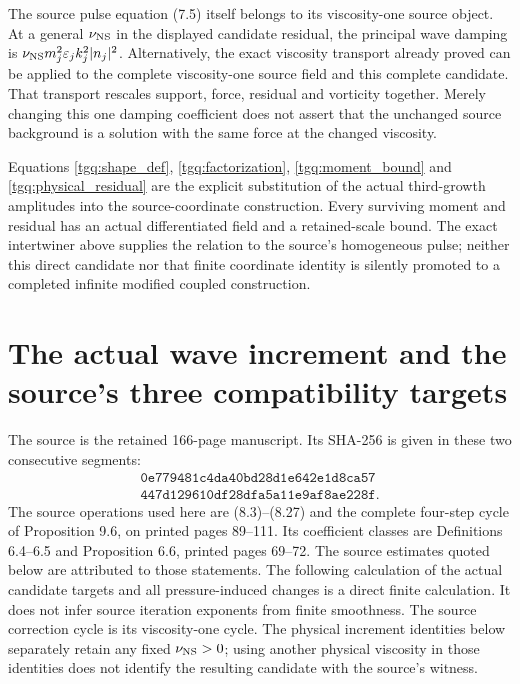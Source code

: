\documentclass[11pt]{article}
\begin{document}
The source pulse equation (7.5) itself belongs to its viscosity-one
source object. At a general $\nu_{\rm NS}$ in the displayed candidate
residual, the principal wave damping is
$\nu_{\rm NS}m_j^2\varepsilon_jk_j^2|n_j|^2$.
Alternatively, the exact viscosity transport already proved can be
applied to the complete viscosity-one source field and this complete
candidate. That transport rescales support, force, residual and
vorticity together. Merely changing this one damping coefficient
does not assert that the unchanged source background is a solution
with the same force at the changed viscosity.

Equations \eqref{tgq:shape_def}, \eqref{tgq:factorization},
\eqref{tgq:moment_bound} and \eqref{tgq:physical_residual} are the
explicit substitution of the actual third-growth amplitudes into
the source-coordinate construction. Every surviving moment and
residual has an actual differentiated field and a retained-scale
bound. The exact intertwiner above supplies the relation to the
source's homogeneous pulse; neither this direct candidate nor that
finite coordinate identity is silently promoted to a completed
infinite modified coupled construction.


\section{The actual wave increment and the source's three compatibility targets}
\label{momop:section}

The source is the retained 166-page manuscript. Its SHA-256 is given
in these two consecutive segments:
\[
\begin{gathered}
\texttt{0e779481c4da40bd28d1e642e1d8ca57}\\
\texttt{447d129610df28dfa5a11e9af8ae228f}.
\end{gathered}
\]
The source operations used here are (8.3)--(8.27) and the complete
four-step cycle of Proposition 9.6, on printed pages 89--111.
Its coefficient classes are Definitions 6.4--6.5 and Proposition 6.6,
printed pages 69--72. The source estimates quoted below are attributed
to those statements. The following calculation of the actual candidate
targets and all pressure-induced changes is a direct finite calculation.
It does not infer source iteration exponents from finite smoothness.
The source correction cycle is its viscosity-one cycle. The physical
increment identities below separately retain any fixed
$\nu_{\rm NS}>0$; using another physical viscosity in those identities
does not identify the resulting candidate with the source's witness.
\end{document}
